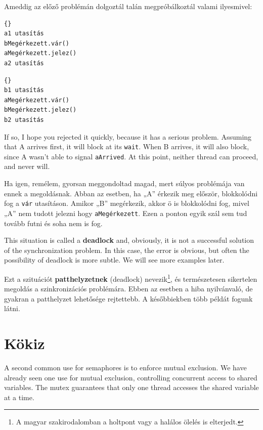 \documentclass{book}
\begin{document}
Ameddig az előző problémán dolgoztál talán megpróbálkoztál valami ilyesmivel:

\begin{minipage}[t]{2in}
\begin{lstlisting}[title={„A” szál}]{}
a1 utasítás
bMegérkezett.vár()
aMegérkezett.jelez()
a2 utasítás
\end{lstlisting}
\end{minipage}
\hfill
\begin{minipage}[t]{2in}
\begin{lstlisting}[title={„B” szál}]{}
b1 utasítás
aMegérkezett.vár()
bMegérkezett.jelez()
b2 utasítás
\end{lstlisting}
\end{minipage}

If so, I hope you rejected it quickly, because it has a serious
problem.  Assuming that A arrives first, it will block at its
{\tt wait}.  When B arrives, it will also block, since A wasn't
able to signal {\tt aArrived}.  At this point, neither thread
can proceed, and never will.

Ha igen, remélem, gyorsan meggondoltad magad, mert súlyos problémája
van ennek a megoldásnak. Abban az esetben, ha „A” érkezik meg először,
blokkolódni fog a {\tt vár} utasításon. Amikor „B” megérkezik, akkor ö
is blokkolódni fog, mivel „A” nem tudott jelezni hogy {\tt aMegérkezett}.
Ezen a ponton egyik szál sem tud tovább futni és soha nem is fog.

This situation is called a {\bf deadlock} and, obviously, it is
not a successful solution of the synchronization problem.  In
this case, the error is obvious, but often the possibility of
deadlock is more subtle.  We will see more examples later.

Ezt a szituációt {\bf patthelyzetnek} (deadlock)
nevezik\footnote{A magyar szakirodalomban a holtpont vagy a halálos ölelés is elterjedt.},
és természetesen sikertelen megoldás a szinkronizációs problémára.
Ebben az esetben a hiba nyilvánvaló, de gyakran a patthelyzet
lehetősége rejtettebb. A későbbiekben több példát fogunk látni.

\section{Kökiz}

A second common use for semaphores is to enforce mutual exclusion.
We have already seen one use for mutual exclusion, controlling
concurrent access to shared variables.  The mutex guarantees
that only one thread accesses the shared variable at a time.
\end{document}
